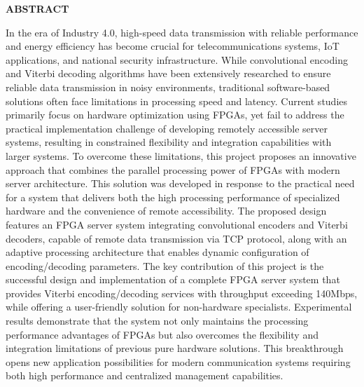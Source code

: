 \documentclass[../DoAn.tex]{subfiles}
\begin{document}
\begin{center}
    \Large{\textbf{ABSTRACT}}\\
\end{center}
\vspace{1cm}
In the era of Industry 4.0, high-speed data transmission with reliable performance and energy efficiency has become crucial for telecommunications systems, IoT applications, and national security infrastructure. While convolutional encoding and Viterbi decoding algorithms have been extensively researched to ensure reliable data transmission in noisy environments, traditional software-based solutions often face limitations in processing speed and latency. Current studies primarily focus on hardware optimization using FPGAs, yet fail to address the practical implementation challenge of developing remotely accessible server systems, resulting in constrained flexibility and integration capabilities with larger systems. To overcome these limitations, this project proposes an innovative approach that combines the parallel processing power of FPGAs with modern server architecture. This solution was developed in response to the practical need for a system that delivers both the high processing performance of specialized hardware and the convenience of remote accessibility. The proposed design features an FPGA server system integrating convolutional encoders and Viterbi decoders, capable of remote data transmission via TCP protocol, along with an adaptive processing architecture that enables dynamic configuration of encoding/decoding parameters. The key contribution of this project is the successful design and implementation of a complete FPGA server system that provides Viterbi encoding/decoding services with throughput exceeding 140Mbps, while offering a user-friendly solution for non-hardware specialists. Experimental results demonstrate that the system not only maintains the processing performance advantages of FPGAs but also overcomes the flexibility and integration limitations of previous pure hardware solutions. This breakthrough opens new application possibilities for modern communication systems requiring both high performance and centralized management capabilities.
\end{document}
